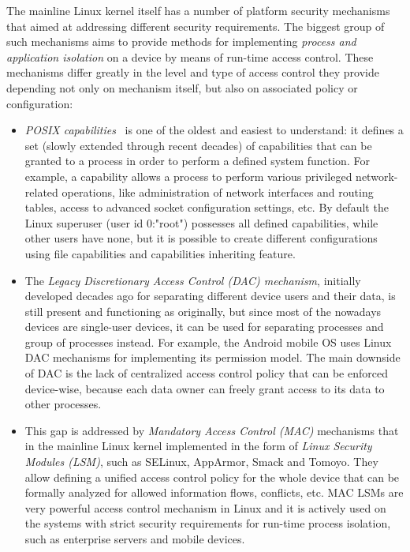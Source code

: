 The mainline Linux kernel itself has a number of platform security mechanisms that aimed at addressing different security requirements. The biggest group of such mechanisms aims to provide methods for implementing \textit{process and application isolation} on a device by means of run-time access control. These mechanisms differ greatly in the level and type of access control they provide depending not only on mechanism itself, but also on associated policy or configuration:

\begin{itemize}
	\item \textit{POSIX capabilities}~\cite{caps} is one of the oldest and easiest to understand: it defines a set (slowly extended through recent decades) of capabilities that can be granted to a process in order to perform a defined system function. For example, a  capability allows a process to perform various privileged network-related operations, like administration of network interfaces and routing tables, access to advanced socket configuration settings, etc. By default the Linux superuser (user id 0:"root") possesses all defined capabilities, while other users have none, but it is possible to create different configurations using file capabilities and capabilities inheriting feature. 
	\item The \textit{Legacy Discretionary Access Control (DAC) mechanism}, initially developed decades ago for separating different device users and their data, is still present and functioning as originally, but since most of the nowadays devices are single-user devices, it can be used for separating processes and group of processes instead. For example, the Android mobile OS uses Linux DAC mechanisms for implementing its permission model. The main downside of DAC is the lack of centralized access control policy that can be enforced device-wise, because each data owner can freely grant access to its data to other processes. 
	\item This gap is addressed by \textit{Mandatory Access Control (MAC)} mechanisms that in the mainline Linux kernel implemented in the form of \textit{Linux Security Modules (LSM)}, such as SELinux, AppArmor, Smack and Tomoyo. They allow defining a unified access control policy for the whole device that can be formally analyzed for allowed information flows, conflicts, etc. MAC LSMs are very powerful access control mechanism in Linux and it is actively used on the systems with strict security requirements for run-time process isolation, such as enterprise servers and mobile devices. 

\end{itemize}
